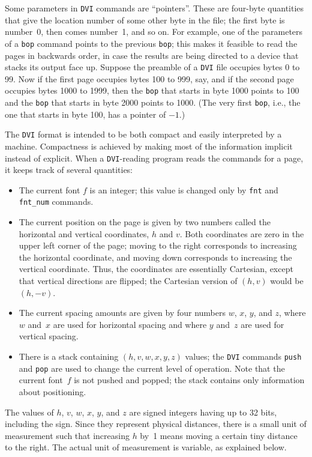 \documentclass[10pt, a4paper]{article}
\begin{document}
Some parameters in \texttt{DVI} commands are ``pointers''. 
These are four-byte quantities that give the location number 
of some other byte in the file; 
the first byte is number~0, then comes number~1, and so on. 
For example, one of the parameters of a \texttt{bop} command 
points to the previous \texttt{bop};
this makes it feasible to read the pages in backwards order, 
in case the results are being directed to a device 
that stacks its output face up. 
Suppose the preamble of a \texttt{DVI} file occupies bytes 0 to 99. 
Now if the first page occupies bytes 100 to 999, say, 
and if the second page occupies bytes 1000 to 1999, 
then the \texttt{bop} that starts in byte 1000
points to 100 and the \texttt{bop} that starts in byte 2000 points to 1000. 
(The very first \texttt{bop}, 
i.e., the one that starts in byte 100, has a pointer of $-1$.)


The  \texttt{DVI} format is intended to be both 
compact and easily interpreted by a machine. 
Compactness is achieved by making most of the information implicit 
instead of explicit. 
When a \texttt{DVI}-reading program reads the commands for a page, 
it keeps track of several quantities: 
%
\begin{itemize}
\item
The current font $f$ is an integer; 
this value is changed only by \texttt{fnt} and \texttt{fnt\_num} commands. 
\item
The current position on the page 
is given by two numbers called the horizontal and vertical coordinates,
$h$ and $v$. 
Both coordinates are zero in the upper left corner of the page; 
moving to the right corresponds to increasing the horizontal coordinate, and
moving down corresponds to increasing the vertical coordinate. 
Thus, the coordinates are essentially Cartesian, 
except that vertical directions are flipped; 
the Cartesian version of $(h,v)$ would be $(h,-v)$.  
\item
The current spacing amounts 
are given by four numbers $w$, $x$, $y$, and $z$,
where $w$ and~$x$ are used for horizontal spacing and where $y$ and~$z$
are used for vertical spacing. 
\item
There is a stack containing $(h,v,w,x,y,z)$ values; 
the \texttt{DVI} commands \texttt{push} and \texttt{pop} are used 
to change the current level of operation. 
Note that the current font~$f$ is not pushed and popped; 
the stack contains only information about positioning.
\end{itemize}

The values of $h$, $v$, $w$, $x$, $y$, and $z$ are signed integers having up
to 32 bits, including the sign. Since they represent physical distances,
there is a small unit of measurement such that increasing $h$ by~1 means
moving a certain tiny distance to the right. The actual unit of
measurement is variable, as explained below. 
\end{document}
